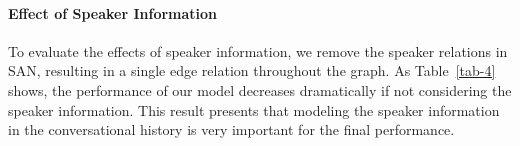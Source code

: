 \documentclass[11pt]{article}
\begin{document}
\begin{table}[tbp]
\centering
{}
\caption{Comparison of different ways of incorporating emotion information. \textit{No}: no emotion information incorporated; \textit{DAEE}: incorporating the emotion information with direct application emotional embedding.}
\label{tab-3}
\end{table}



\paragraph{Effect of Speaker Information}
To evaluate the effects of speaker information, we remove the speaker relations in SAN, resulting in a single edge relation throughout the graph. As Table~\ref{tab-4} shows, the performance of our model decreases dramatically if not considering the speaker information. This result presents that modeling the speaker information in the conversational history is very important for the final performance.

\begin{table}[htbp]
\centering
{}
\caption{Results on experiments whether considering speaker information or not in SAN.}
\label{tab-4}
\end{table}
\end{document}
